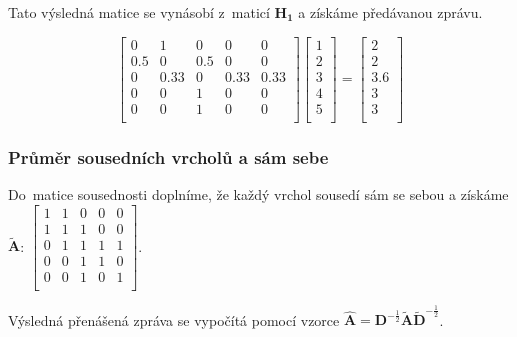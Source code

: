 Tato výsledná matice se vynásobí z~maticí $\mathbf{H_1}$ a získáme předávanou zprávu.

$$
\left[ \begin{matrix}
0 & 1 & 0 & 0 & 0 \\
0.5 & 0 & 0.5 & 0 & 0 \\
0 & 0.33 & 0 & 0.33 & 0.33 \\
0 & 0 & 1 & 0 & 0 \\
0 & 0 & 1 & 0 & 0 \\
\end{matrix} \right]
\left[ \begin{matrix}
1 \\
2 \\
3 \\
4 \\
5 \\
\end{matrix} \right] = 
\left[ \begin{matrix}
2 \\
2 \\
3.6 \\
3 \\
3 \\
\end{matrix} \right] 
$$

\subsubsection{Průměr sousedních vrcholů a sám sebe}

Do~matice sousednosti doplníme, že každý vrchol sousedí sám se sebou a získáme $\mathbf{\tilde{A}}$:
$\left[ \begin{matrix}
1 & 1 & 0 & 0 & 0 \\
1 & 1 & 1 & 0 & 0 \\
0 & 1 & 1 & 1 & 1 \\
0 & 0 & 1 & 1 & 0 \\
0 & 0 & 1 & 0 & 1 \\
\end{matrix} \right]$.

Výsledná přenášená zpráva se vypočítá pomocí vzorce
$\mathbf{\hat{A}} = \mathbf{D}^{-\frac{1}{2}}\mathbf{\tilde{A}}\mathbf{\tilde{D}}^{-\frac{1}{2}}$.
